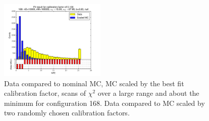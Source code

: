 \begin{figure}[htbp]
\begin{center}
\includegraphics[width=0.45\textwidth]{../FIGURES/168/FIG_Fit_result_for_calibration_factor_of_0_100.pdf} 
\caption{Data compared to nominal MC, MC scaled by the best fit calibration factor, scans of $\chi^2$ over a large range and about the minimum for configuration 168. Data compared to MC scaled by two randomly chosen calibration factors.} 
\label{tab:best_168} 
\end{center} \end{figure} 

